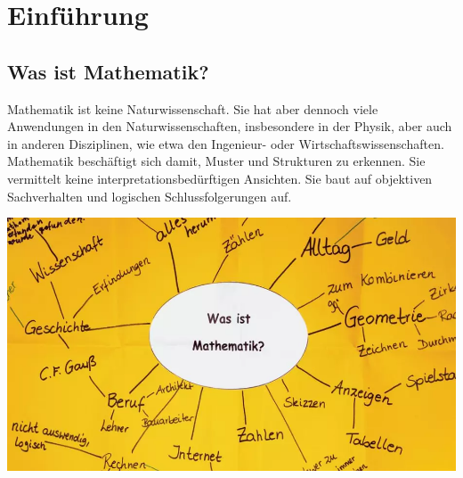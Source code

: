 \chapter{Einführung}

\section{Was ist Mathematik?}
Mathematik ist keine Naturwissenschaft. Sie hat aber dennoch viele Anwendungen in den Naturwissenschaften, insbesondere in der Physik, aber auch in anderen Disziplinen, wie etwa den Ingenieur- oder Wirtschaftswissenschaften. Mathematik beschäftigt sich damit, Muster und Strukturen zu erkennen. Sie vermittelt keine interpretationsbedürftigen Ansichten. Sie baut auf objektiven Sachverhalten und logischen Schlussfolgerungen auf.\par

\includegraphics[width=.5\linewidth]{WasIstMathematik}

